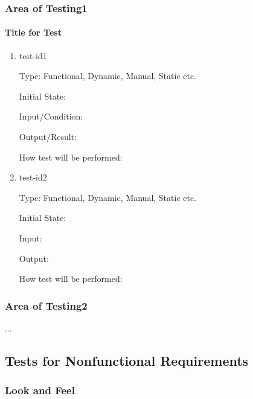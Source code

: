 \documentclass[12pt, titlepage]{article}
\begin{document}


\subsubsection{Area of Testing1}
		
\paragraph{Title for Test}

\begin{enumerate}

\item{test-id1\\}

Type: Functional, Dynamic, Manual, Static etc.
					
Initial State: 
					
Input/Condition: 
					
Output/Result: 
					
How test will be performed: 
					
\item{test-id2\\}

Type: Functional, Dynamic, Manual, Static etc.
					
Initial State: 
					
Input: 
					
Output: 
					
How test will be performed: 

\end{enumerate}

\subsubsection{Area of Testing2}

...

\subsection{Tests for Nonfunctional Requirements}

\subsubsection{Look and Feel}
		
\end{document}
